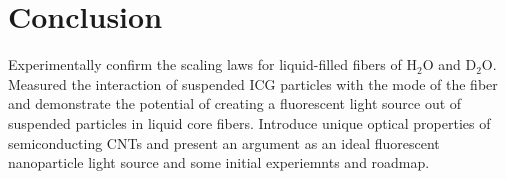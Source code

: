 \chapter{Conclusion}
Experimentally confirm the scaling laws for liquid-filled fibers of H${}_2$O and D${}_2$O. Measured the interaction of suspended ICG particles with the mode of the fiber and demonstrate the potential of creating a fluorescent light source out of suspended particles in liquid core fibers. Introduce unique optical properties of semiconducting CNTs and present an argument as an ideal fluorescent nanoparticle light source and some initial experiemnts and roadmap. 